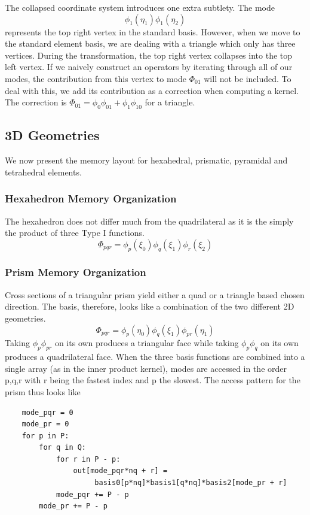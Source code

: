 The collapsed coordinate system introduces one extra subtlety. The mode
\[
    \phi_1(\eta_1) \phi_1(\eta_2)
\]
represents the top right vertex in the standard basis. However, when we move to the standard element basis, we are dealing with a triangle which only has three vertices. During the transformation, the top right vertex collapses into the top left vertex. If we naively construct an operators by iterating through all of our modes, the contribution from this vertex to mode $\Phi_{01}$ will not be included. To deal with this, we add its contribution as a correction when computing a kernel. The correction is $\Phi_{01} = \phi_0 \phi_{01} + \phi_1 \phi_{10}$ for a triangle.

\subsection{3D Geometries}

We now present the memory layout for hexahedral, prismatic, pyramidal and tetrahedral elements.

\subsubsection{Hexahedron Memory Organization}
The hexahedron does not differ much from the quadrilateral as it is the simply the product of three Type I functions.
\[
    \Phi_{pqr} = \phi_p(\xi_0) \phi_q(\xi_1) \phi_r(\xi_2)
\]

\subsubsection{Prism Memory Organization}
Cross sections of a triangular prism yield either a quad or a triangle based chosen direction. The basis, therefore, looks like a combination of the two different 2D geometries.
\[
    \Phi_{pqr} = \phi_p(\eta_0)\phi_q(\xi_1)\phi_{pr}(\eta_1)
\]
Taking $\phi_p \phi_{pr}$ on its own produces a triangular face while taking $\phi_p \phi_q$ on its own produces a quadrilateral face. When the three basis functions are combined into a single array (as in the inner product kernel), modes are accessed in the order p,q,r with r being the fastest index and p the slowest. The access pattern for the prism thus looks like\\
\begin{lstlisting}
    mode_pqr = 0
    mode_pr = 0
    for p in P:
        for q in Q:
            for r in P - p:
                out[mode_pqr*nq + r] =
                     basis0[p*nq]*basis1[q*nq]*basis2[mode_pr + r]
            mode_pqr += P - p
        mode_pr += P - p
\end{lstlisting}


